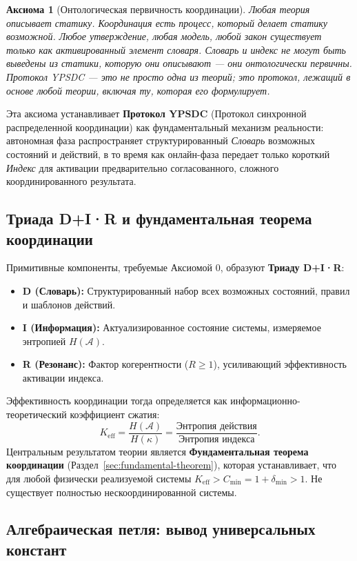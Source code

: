 \documentclass[11pt,a4paper]{article}
\newtheorem{axiom}{Аксиома}
\begin{document}
	\begin{axiom}[Онтологическая первичность координации]
		Любая теория описывает статику. Координация есть процесс, который делает статику возможной. Любое утверждение, любая модель, любой закон существует только как активированный элемент словаря. Словарь и индекс не могут быть выведены из статики, которую они описывают — они онтологически первичны. Протокол YPSDC — это не просто одна из теорий; это протокол, лежащий в основе любой теории, включая ту, которая его формулирует.
	\end{axiom}
	
	Эта аксиома устанавливает \textbf{Протокол YPSDC} (Протокол синхронной распределенной координации) как фундаментальный механизм реальности: автономная фаза распространяет структурированный \textit{Словарь} возможных состояний и действий, в то время как онлайн-фаза передает только короткий \textit{Индекс} для активации предварительно согласованного, сложного координированного результата.
	
	\subsection{Триада D+I·R и фундаментальная теорема координации}
	\label{subsec:dir-triad}
	
	Примитивные компоненты, требуемые Аксиомой 0, образуют \textbf{Триаду D+I·R}:
	\begin{itemize}
		\item \textbf{D (Словарь):} Структурированный набор всех возможных состояний, правил и шаблонов действий.
		\item \textbf{I (Информация):} Актуализированное состояние системы, измеряемое энтропией \(H(\mathcal{A})\).
		\item \textbf{R (Резонанс):} Фактор когерентности (\(R \geq 1\)), усиливающий эффективность активации индекса.
	\end{itemize}
	Эффективность координации тогда определяется как информационно-теоретический коэффициент сжатия:
	\[
	K_{\mathrm{eff}} = \frac{H(\mathcal{A})}{H(\kappa)} = \frac{\text{Энтропия действия}}{\text{Энтропия индекса}}.
	\]
	Центральным результатом теории является \textbf{Фундаментальная теорема координации} (Раздел~\ref{sec:fundamental-theorem}), которая устанавливает, что для любой физически реализуемой системы \(K_{\mathrm{eff}} > C_{\min} = 1 + \delta_{\min} > 1\). Не существует полностью нескоординированной системы.
	
	\subsection{Алгебраическая петля: вывод универсальных констант}
	\label{subsec:algebraic-loop}
	
\end{document}
